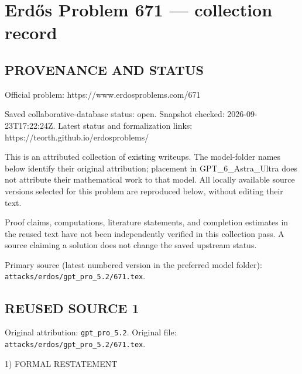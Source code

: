 \section*{Erd\H{o}s Problem 671 --- collection record}

\subsection*{PROVENANCE AND STATUS}
Official problem: https://www.erdosproblems.com/671

Saved collaborative-database status: open.
Snapshot checked: 2026-09-23T17:22:24Z.
Latest status and formalization links: https://teorth.github.io/erdosproblems/

This is an attributed collection of existing writeups. The model-folder names below identify their original attribution; placement in GPT\_6\_Astra\_Ultra does not attribute their mathematical work to that model. All locally available source versions selected for this problem are reproduced below, without editing their text.

Proof claims, computations, literature statements, and completion estimates in the reused text have not been independently verified in this collection pass. A source claiming a solution does not change the saved upstream status.

Primary source (latest numbered version in the preferred model folder): \texttt{attacks/erdos/gpt\_pro\_5.2/671.tex}.

\subsection*{REUSED SOURCE 1}
Original attribution: \texttt{gpt\_pro\_5.2}.
Original file: \texttt{attacks/erdos/gpt\_pro\_5.2/671.tex}.


1) FORMAL RESTATEMENT

